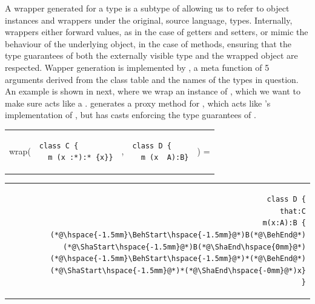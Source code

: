 \documentclass[a4paper,USenglish]{tex/lipics-v2016}
\begin{document}
A wrapper generated for a type \C is a subtype of \C allowing us to refer to
object instances and wrappers under the original, source language,
types. Internally, wrappers either forward values, as in the case of getters
and setters, or mimic the behaviour of the underlying object, in the case of
methods, ensuring that the type guarantees of both the externally visible
type and the wrapped object are respected.
Wapper generation is implemented by , a meta function of 5
arguments derived from the class table and the names of the types in
question.  An example is shown in next, where we wrap an
instance of \C, which we want to make sure acts like a \D. 
generates a proxy method for \m, which acts like \C's implementation of \m,
but has casts enforcing the type guarantees of \D.


{  \small
\hspace{-6mm}\begin{tabular}{ER{3.5cm}ER{3cm}l}
wrap( & 
\begin{lstlisting}
class C {
  m (x :*):* {x}}
\end{lstlisting}& , &
\begin{lstlisting}
class D {
  m (x  A):B}
\end{lstlisting}&) =
\end{tabular}
\begin{tabular}{@{}l@{}r@{}}
&
\begin{minipage}{6cm}
\begin{lstlisting}
class D {
 that:C
 m(x:A):B { (*@\hspace{-1.5mm}\BehStart\hspace{-1.5mm}@*)B(*@\BehEnd@*)(*@\ShaStart\hspace{-1.5mm}@*)B(*@\ShaEnd\hspace{0mm}@*)(*@\hspace{-1.5mm}\BehStart\hspace{-1.5mm}@*)*(*@\BehEnd@*)(*@\ShaStart\hspace{-1.5mm}@*)*(*@\ShaEnd\hspace{-0mm}@*)x}
}
\end{lstlisting}
\end{minipage}
\end{tabular}
}
\end{document}
